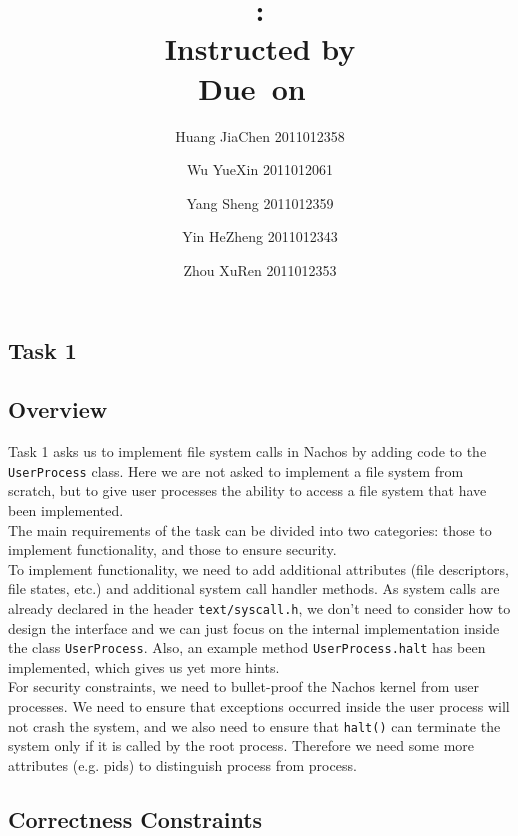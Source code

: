 \documentclass{article}
\title{\textmd{\bf \Class: \Title}\\{\large Instructed by \textit{\ClassInstructor}}\\\normalsize\vspace{0.1in}\small{Due\ on\ \DueDate}}
\date{}
\author{%
  Huang JiaChen 2011012358 \and
  Wu YueXin 2011012061 \and
  Yang Sheng 2011012359 \and
  Yin HeZheng 2011012343 \and
  Zhou XuRen 2011012353}
\begin{document}
  \begin{spacing}{1.1}
    \maketitle \thispagestyle{empty}


 
\section{Task 1}
\subsection{Overview}
Task 1 asks us to implement file system calls  in Nachos by adding code to the \texttt{UserProcess} class. Here we are not asked to implement a file system from scratch, but to give user processes the ability to access a file system that have been implemented.\\
The main requirements of the task can be divided into two categories: those to implement functionality, and those to ensure security.\\
To implement functionality, we need to add additional attributes (file descriptors, file states, etc.) and additional system call handler methods. As system calls are already declared in the header \texttt{text/syscall.h}, we don't need to consider how to design the interface and we can just focus on the internal implementation inside the class \texttt{UserProcess}. Also, an example method \texttt{UserProcess.halt} has been implemented, which gives us yet more hints.\\
For security constraints, we need to bullet-proof the Nachos kernel from user processes. We need to ensure that exceptions occurred inside the user process will not crash the system, and we also need to ensure that \texttt{halt()} can terminate the system only if it is called by the root process. Therefore we need some more attributes (e.g. pids) to distinguish process from process.\\

\subsection{Correctness Constraints}

\begin{asparaitem}
\end{asparaitem}


\end{spacing}
\end{document}
